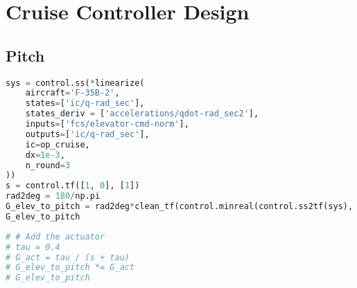 \hypertarget{cruise-controller-design}{%
\section{Cruise Controller Design}\label{cruise-controller-design}}

\hypertarget{pitch-1}{%
\subsection{Pitch}\label{pitch-1}}

\begin{lstlisting}[language=Python]
sys = control.ss(*linearize(
    aircraft='F-35B-2',
    states=['ic/q-rad_sec'],
    states_deriv = ['accelerations/qdot-rad_sec2'],
    inputs=['fcs/elevator-cmd-norm'],
    outputs=['ic/q-rad_sec'],
    ic=op_cruise,
    dx=1e-3,
    n_round=3
))
s = control.tf([1, 0], [1])
rad2deg = 180/np.pi
G_elev_to_pitch = rad2deg*clean_tf(control.minreal(control.ss2tf(sys), 1e-3))/s  # in degrees
G_elev_to_pitch
\end{lstlisting}

\begin{lstlisting}[language=Python]
# # Add the actuator 
# tau = 0.4
# G_act = tau / (s + tau)
# G_elev_to_pitch *= G_act
# G_elev_to_pitch
\end{lstlisting}

